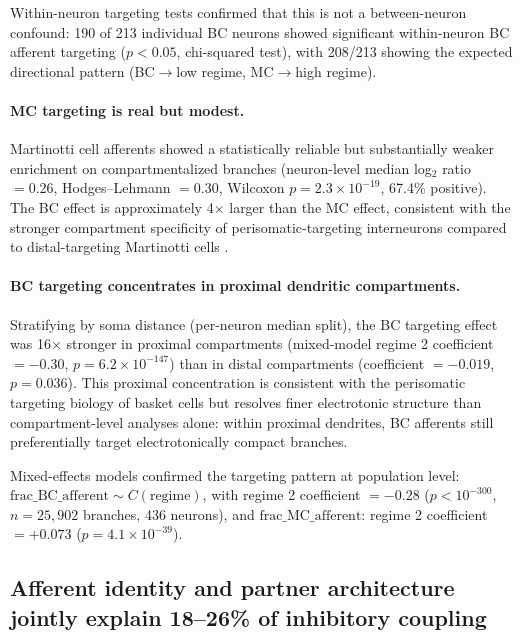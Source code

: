 \documentclass[11pt]{article}
\begin{document}
Within-neuron targeting tests confirmed that this is not a between-neuron confound: 190 of 213 individual BC neurons showed significant within-neuron BC afferent targeting ($p < 0.05$, chi-squared test), with 208/213 showing the expected directional pattern (BC$\to$low regime, MC$\to$high regime).

\paragraph{MC targeting is real but modest.} Martinotti cell afferents showed a statistically reliable but substantially weaker enrichment on compartmentalized branches (neuron-level median log$_2$ ratio $= 0.26$, Hodges--Lehmann $= 0.30$, Wilcoxon $p = 2.3 \times 10^{-19}$, 67.4\% positive). The BC effect is approximately 4$\times$ larger than the MC effect, consistent with the stronger compartment specificity of perisomatic-targeting interneurons compared to distal-targeting Martinotti cells \citep{markram2004, schneider2023}.

\paragraph{BC targeting concentrates in proximal dendritic compartments.} Stratifying by soma distance (per-neuron median split), the BC targeting effect was 16$\times$ stronger in proximal compartments (mixed-model regime 2 coefficient $= -0.30$, $p = 6.2 \times 10^{-147}$) than in distal compartments (coefficient $= -0.019$, $p = 0.036$). This proximal concentration is consistent with the perisomatic targeting biology of basket cells \citep{schneider2023} but resolves finer electrotonic structure than compartment-level analyses alone: within proximal dendrites, BC afferents still preferentially target electrotonically compact branches.

Mixed-effects models confirmed the targeting pattern at population level: $\text{frac\_BC\_afferent} \sim C(\text{regime})$, with regime 2 coefficient $= -0.28$ ($p < 10^{-300}$, $n = 25{,}902$ branches, 436 neurons), and $\text{frac\_MC\_afferent}$: regime 2 coefficient $= +0.073$ ($p = 4.1 \times 10^{-39}$).


\subsection{Afferent identity and partner architecture jointly explain 18--26\% of inhibitory coupling}
\label{sec:chained_model}
\end{document}
